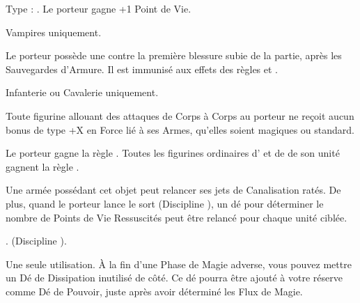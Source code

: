 \endpricelist

\armymagicalarmour

\startpricelist

 Type : \platearmour{}. Le porteur gagne +1 Point de Vie.

\endpricelist

\armytalismans

\startpricelist

 Vampires uniquement.

Le porteur possède une  contre la première blessure subie de la partie, après les Sauvegardes d'Armure. Il est immunisé aux effets des règles  et \multiplewounds{}{}.

 Infanterie ou Cavalerie uniquement.

Toute figurine allouant des attaques de Corps à Corps au porteur ne reçoit aucun bonus de type +X en Force lié à ses Armes, qu'elles soient magiques ou standard.

\endpricelist

\armyenchanteditems

\startpricelist

 Le porteur gagne la règle \distracting{}. Toutes les figurines ordinaires d'\infantry{} et de \cavalry{} de son unité gagnent la règle \parry{}.

\endpricelist

\armyarcaneitems

\startpricelist

 Une armée possédant cet objet peut relancer ses jets de Canalisation ratés. De plus, quand le porteur lance le sort \necromancysignature{} (Discipline \necromancy{}), un dé pour déterminer le nombre de Points de Vie Ressuscités peut être relancé pour chaque unité ciblée.

 . \necromancyspelltwo{} (Discipline \necromancy{}).

 Une seule utilisation. À la fin d'une Phase de Magie adverse, vous pouvez mettre un Dé de Dissipation inutilisé de côté. Ce dé pourra être ajouté à votre réserve comme Dé de Pouvoir, juste après avoir déterminé les Flux de Magie.

\endpricelist

\armymagicalbanners

